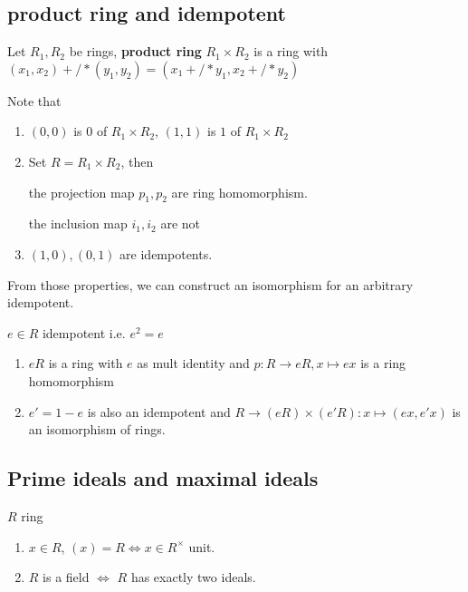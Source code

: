 \subsection{product ring and idempotent}
\begin{definition}
    Let  $ R_1,R_2  $ be rings, \textbf{product ring}  $ R_1\times R_2  $ is a ring with  $ (x_1,x_2)+/*(y_1,y_2)=(x_1+/*y_1,x_2+/*y_2) $ 
\end{definition}
\begin{remark}
    Note that
    \begin{enumerate}
        \item  $ (0,0) $ is  $ 0  $ of  $ R_1\times R_2  $, $ (1,1) $ is  $ 1  $ of  $ R_1\times R_2 $ 
        \item Set  $ R=R_1\times R_2 $, then
        \par 
        the projection map  $ p_1,p_2  $ are ring homomorphism.
        \par 
        the inclusion map  $ i_1,i_2  $ are not 
        \item  $ (1,0),(0,1) $ are idempotents.
    \end{enumerate} 
\end{remark}
From those properties, we can construct an isomorphism for an arbitrary idempotent.
\begin{proposition}
     $ e\in R  $ idempotent i.e.  $ e^2=e  $ 
     \begin{enumerate}
        \item  $ eR  $ is a ring with  $ e  $ as mult identity and  $ p:R\rightarrow eR,x\mapsto ex  $ is a ring homomorphism
        \item  $ e'=1-e  $ is also an idempotent and  $ R\rightarrow (eR)\times(e'R):x\mapsto(ex,e'x)$ is an isomorphism of rings.
     \end{enumerate}
\end{proposition}
\subsection{Prime ideals and maximal ideals}
\begin{observe}
     $ R  $ ring
     \begin{enumerate}
        \item  $ x\in R  $,  $ (x)=R\Leftrightarrow x\in R^\times  $ unit.
        \item  $ R  $ is a field  $ \Leftrightarrow  $  $ R  $ has exactly two ideals.
     \end{enumerate}
\end{observe}

